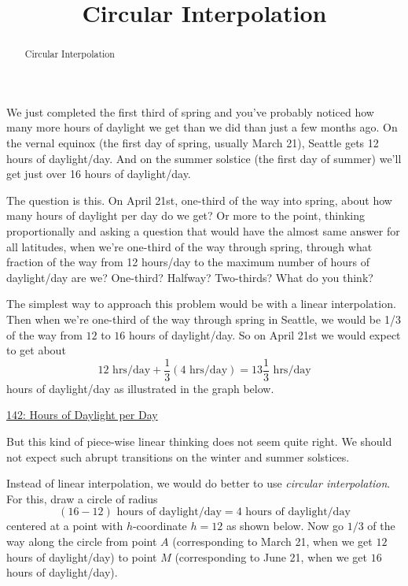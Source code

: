 \documentclass{ximera}
\title{Circular Interpolation}
\begin{document}
\begin{abstract}
Circular Interpolation
\end{abstract}
\maketitle


We just completed the first third of spring and you've probably noticed how many more hours of daylight we get than we did than just a few months ago. On the vernal equinox (the first day of spring, usually March 21), Seattle gets 12 hours of daylight/day. And on the summer solstice (the first day of summer) we'll get just over 16 hours of daylight/day. 

The question is this. On April 21st, one-third of the way into spring, about how many hours of daylight per day do we get? Or more to the point, thinking proportionally and asking a question that would have the almost same answer for all latitudes, when we're one-third of the way through spring, through what fraction of the way from 12 hours/day to the maximum number of hours of daylight/day are we? One-third? Halfway? Two-thirds? What do you think?

The simplest way to approach this problem would be with a linear interpolation. Then when we're one-third of the way through spring in Seattle, we would be 1/3 of the way from $12$ to $16$ hours of daylight/day. So on April 21st we would expect to get about
\[
    12 \text{ hrs/day} + \frac{1}{3}(4 \text{ hrs/day}) = 13 \frac{1}{3}\text{ hrs/day}
\]
hours of daylight/day as illustrated in the graph below.


\begin{onlineOnly}
    \begin{center}
\end{center}
\end{onlineOnly}

\href{https://www.desmos.com/calculator/esj3yytaug}{142: Hours of Daylight per Day}

But this kind of piece-wise linear thinking does not seem quite right. We should not expect such abrupt transitions on the winter and summer solstices.

Instead of linear interpolation, we would do better to use \emph{circular interpolation}. For this, draw a circle of radius 
\[
     (16 - 12) \text{ hours of daylight/day} = 4 \text{ hours of daylight/day}
\]
centered at a point with $h$-coordinate $h=12$ as shown below. Now go $1/3$ of the way along the circle from point $A$ (corresponding to March 21, when we get $12$ hours of daylight/day) to point $M$ (corresponding to June 21, when we get $16$ hours of daylight/day).
\end{document}
